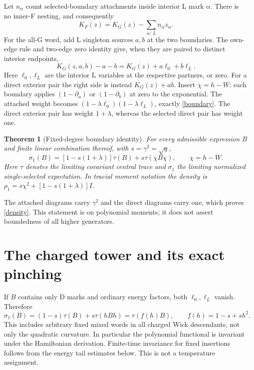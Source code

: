 \documentclass[11pt]{article}
\newtheorem{theorem}{Theorem}
\begin{document}
Let $n_\alpha$ count selected-boundary attachments inside interior
L mark $\alpha$. There is no inner-F nesting, and consequently
\begin{equation}
 K_F(z)=K_G(z)-\sum_{\alpha:\,L}n_\alpha z_\alpha.\label{boundary}
\end{equation}
For the all-G word, add L singleton sources $a,b$ at the two boundaries.
The own-edge rule and two-edge zero identity give, when they are paired
to distinct interior endpoints,
\[
 K_G(z,a,b)-a-b=K_G(z)+a\ell_0+b\ell_L.
\]
Here $\ell_0,\ell_L$ are the interior L variables at the respective
partners, or zero. For a direct exterior pair the right side is instead
$K_G(z)+ab$. Insert $\chi=h-W$: each boundary applies
$(1-\partial_a)$ or $(1-\partial_b)$ at zero to the exponential.
The attached weight becomes $(1-\lambda\ell_0)(1-\lambda\ell_L)$,
exactly \eqref{boundary}. The direct exterior pair has weight
$1+\lambda$, whereas the selected direct pair has weight one.

\begin{theorem}[Fixed-degree boundary identity]
For every admissible expression $B$ and finite linear combination thereof,
with $s=\gamma^2=\sqrt q$,
\begin{equation}
 \sigma_1(B)=[1-s(1+\lambda)]\tau(B)+s\tau(\chi B\chi),
 \qquad \chi=h-W.\label{density}
\end{equation}
Here $\tau$ denotes the limiting covariant central trace and $\sigma_1$
the limiting normalized single-selected expectation. In tracial moment
notation the density is $\rho_1=s\chi^2+[1-s(1+\lambda)]I$.
\end{theorem}
The attached diagrams carry $\gamma^2$ and the direct diagrams carry
one, which proves \eqref{density}. This statement is on polynomial
moments; it does not assert boundedness of all higher generators.

\newpage
\section{The charged tower and its exact pinching}
If $B$ contains only D marks and ordinary energy factors, both
$\ell_0,\ell_L$ vanish. Therefore
\begin{equation}
 \sigma_1(B)=(1-s)\tau(B)+s\tau(hBh)=\tau(f(h)B),
 \qquad f(h)=1-s+s h^2.\label{charged-density}
\end{equation}
This includes arbitrary fixed mixed words in all charged Wick
descendants, not only the quadratic curvature. In particular the
polynomial functional is invariant under the Hamiltonian derivation.
Finite-time invariance for fixed insertions follows from the energy
tail estimates below. This is not a temperature assignment.
\end{document}
